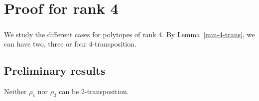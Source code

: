 \chapter{Proof for rank 4}

\paragraph{}
We study the different cases for polytopes of rank 4. By Lemma~\ref{min-4-trans}, we can have two, three or four 4-transposition.

\section{Preliminary results}

\begin{theorem}
  Neither $\rho_1$ nor $\rho_2$ can be 2-transposition.
\end{theorem}


